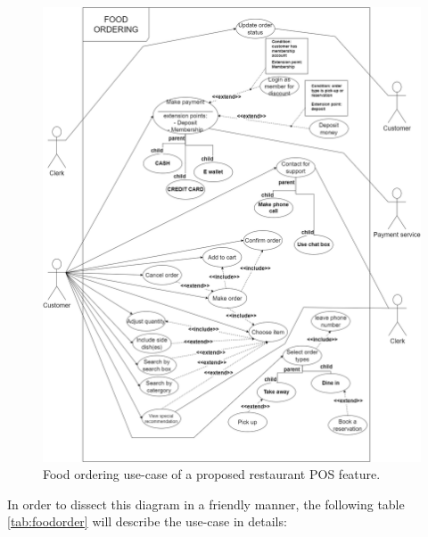 \documentclass[12pt, a4paper]{article}
\theoremstyle{styleth}
\theoremstyle{styledef}
\begin{document}
\begin{figure}[H]
	\centering
	\includegraphics[width=15.5cm]{272520954_703266950872464_5753385862413650595_n.png}
	\caption{Food ordering use-case of a proposed restaurant POS feature.}
	\label{fig:foodusecase}
\end{figure}

In order to dissect this diagram in a friendly manner, the following table \ref{tab:foodorder} will describe the use-case in details:
\end{document}
